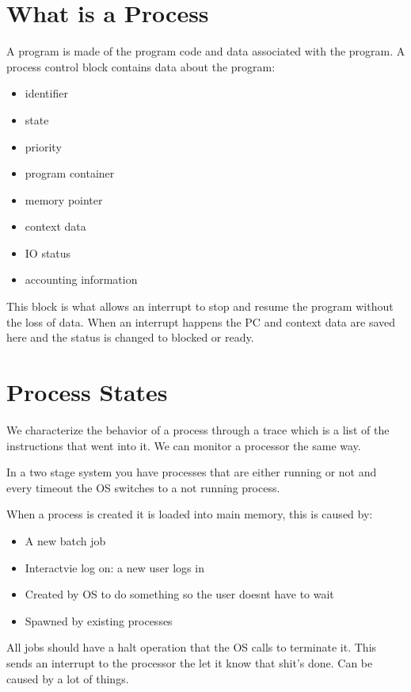 \documentclass[12pt]{article}
\begin{document}


\section{What is a Process}
A program is made of the program code and data associated with the program. A process control block contains data about the program:
\begin{itemize}
    \item identifier
    \item state
    \item priority
    \item program container
    \item memory pointer
    \item context data
    \item IO status
    \item accounting information
\end{itemize}

This block is what allows an interrupt to stop and resume the program without the loss of data. When an interrupt happens the PC and context data are saved here and the status is changed to blocked or ready.

\section{Process States}
We characterize the behavior of a process through a trace which is a list of the instructions that went into it. We can monitor a processor the same way.

In a two stage system you have processes that are either running or not and every timeout the OS switches to a not running process.

When a process is created it is loaded into main memory, this is caused by:
\begin{itemize}
    \item A new batch job
    \item Interactvie log on: a new user logs in
    \item Created by OS to do something so the user doesnt have to wait
    \item Spawned by existing processes
\end{itemize}

All jobs should have a halt operation that the OS calls to terminate it. This sends an interrupt to the processor the let it know that shit's done. Can be caused by a lot of things.
\end{document}
